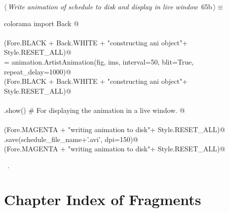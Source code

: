 \documentclass[11.5pt]{report}
\begin{document}
\vspace{-0.8cm} \newchunk


\begin{flushleft} \small\label{scrap99}\raggedright\small
{} $\langle\,${\itshape Write animation of schedule to disk and display in live window}\nobreak\ {\footnotesize {65b}}$\,\rangle\equiv$
\vspace{-1ex}
\begin{list}{}{} \item
\mbox{}\verb@from colorama import Back @\\
\mbox{}\verb@@\\
\mbox{}\verb@debug(Fore.BLACK + Back.WHITE + "\nStarted constructing ani object"+ Style.RESET_ALL)@\\
\mbox{}\verb@ani = animation.ArtistAnimation(fig, ims, interval=50, blit=True, repeat_delay=1000)@\\
\mbox{}\verb@debug(Fore.BLACK + Back.WHITE + "\nFinished constructing ani object"+ Style.RESET_ALL)@\\
\mbox{}\verb@@\\
\mbox{}\verb@plt.show() # For displaying the animation in a live window. @\\
\mbox{}\verb@@\\
\mbox{}\verb@debug(Fore.MAGENTA + "\nStarted writing animation to disk"+ Style.RESET_ALL)@\\
\mbox{}\verb@ani.save(schedule_file_name+'.avi', dpi=150)@\\
\mbox{}\verb@debug(Fore.MAGENTA + "\nFinished writing animation to disk"+ Style.RESET_ALL)@\\
\mbox{}\verb@@{\NWsep}
\end{list}
\vspace{-1.5ex}
\footnotesize
\begin{list}{}{\setlength{\itemsep}{-\parsep}\setlength{\itemindent}{-\leftmargin}}
\item \NWtxtMacroRefIn\ .

\item{}
\end{list}
\vspace{4ex}
\end{flushleft}

\section{Chapter Index of Fragments}
\end{document}
